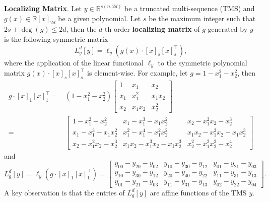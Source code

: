 \documentclass[
]{book}
\theoremstyle{definition}
\theoremstyle{definition}
\theoremstyle{definition}
\theoremstyle{definition}
\theoremstyle{remark}
\begin{document}
\textbf{Localizing Matrix}. Let \(y \in \mathbb{R}^{s(n,2d)}\) be a truncated multi-sequence (TMS) and \(g(x) \in \mathbb{R}[x]_{2d}\) be a given polynomial. Let \(s\) be the maximum integer such that \(2s + \deg(g) \leq 2d\), then the \(d\)-th order \textbf{localizing matrix} of \(g\) generated by \(y\) is the following symmetric matrix
\begin{equation}
L_{g}^d [y] = \ell_y\left( g(x)\cdot [x]_s [x]_s^\top\right),
\label{eq:localizing-matrix}
\end{equation}
where the application of the linear functional \(\ell_y\) to the symmetric polynomial matrix \(g(x) \cdot [x]_s [x]_s^\top\) is element-wise. For example, let \(g = 1- x_1^2 - x_2^2\), then
\begin{equation}
\begin{split}
g\cdot [x]_1 [x]_1^\top=&  (1-x_1^2 - x_2^2) \begin{bmatrix} 1 & x_1 & x_2 \\ 
x_1 & x_1^2 & x_1 x_2 \\
x_2 & x_1 x_2 & x_2^2 \end{bmatrix} \\
= & \begin{bmatrix} 1 - x_1^2 - x_2^2 & x_1 - x_1^3 - x_1 x_2^2 & x_2 - x_1^2 x_2 - x_2^3 \\
x_1 - x_1^3 - x_1 x_2^2 & x_1^2 - x_1^4 - x_1^2 x_2^2 & x_1 x_2 - x_1^3 x_2 - x_1 x_2^3 \\
x_2 - x_1^2 x_2 - x_2^3 & x_1 x_2 - x_1^3 x_2 - x_1 x_2^3 & x_2^2 - x_1^2 x_2^2 - x_2^4
\end{bmatrix}
\end{split}
\end{equation}
and
\begin{equation}
L_g^d[y] = \ell_y (g\cdot [x]_1 [x]_1^\top) = \begin{bmatrix}
y_{00} - y_{20} - y_{02} & y_{10} - y_{30} - y_{12} & y_{01} - y_{21} - y_{03} \\
y_{10} - y_{30} - y_{12} & y_{20} - y_{40} - y_{22} & y_{11} - y_{31} - y_{13} \\
y_{01} - y_{21} - y_{03} &  y_{11} - y_{31} - y_{13} & y_{02} - y_{22} - y_{04}
\end{bmatrix}.
\label{eq:example-localizing-matrix}
\end{equation}
A key observation is that the entries of \(L_g^d[y]\) are affine functions of the TMS \(y\).
\end{document}
